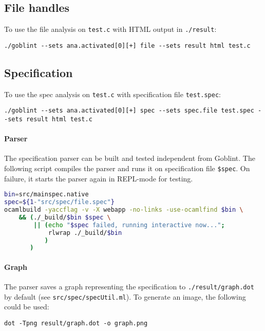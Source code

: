 \subsection{File handles}
To use the file analysis on \verb|test.c| with HTML output in \verb|./result|:
\begin{lstlisting}
./goblint --sets ana.activated[0][+] file --sets result html test.c
\end{lstlisting}

\subsection{Specification}
To use the spec analysis on \verb|test.c| with specification file \verb|test.spec|:
\begin{lstlisting}
./goblint --sets ana.activated[0][+] spec --sets spec.file test.spec --sets result html test.c
\end{lstlisting}
\paragraph*{Parser}
The specification parser can be built and tested independent from Goblint. The following script compiles the parser and runs it on specification file \verb|$spec|. On failure, it starts the parser again in REPL-mode for testing.
\begin{lstlisting}[language=bash]
bin=src/mainspec.native
spec=${1-"src/spec/file.spec"}
ocamlbuild -yaccflag -v -X webapp -no-links -use-ocamlfind $bin \
    && (./_build/$bin $spec \
        || (echo "$spec failed, running interactive now...";
            rlwrap ./_build/$bin
           )
       )
\end{lstlisting}
\paragraph*{Graph}
The parser saves a graph representing the specification to \verb|./result/graph.dot| by default (see \verb|src/spec/specUtil.ml|).
To generate an image, the following could be used:
\begin{lstlisting}
dot -Tpng result/graph.dot -o graph.png 
\end{lstlisting}
